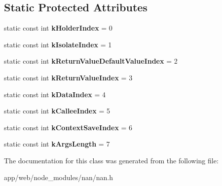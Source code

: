 \subsection*{Static Protected Attributes}
\begin{DoxyCompactItemize}
\item 
\mbox{\label{class_nan_1_1_function_callback_info_ac8350fbf0aba0449e7c6395d5af87ab2}} 
static const int {\bfseries k\+Holder\+Index} = 0
\item 
\mbox{\label{class_nan_1_1_function_callback_info_a0d0886259f0f67d56e927628b8e25a31}} 
static const int {\bfseries k\+Isolate\+Index} = 1
\item 
\mbox{\label{class_nan_1_1_function_callback_info_ad631440c4665af55571a2399542ae2f8}} 
static const int {\bfseries k\+Return\+Value\+Default\+Value\+Index} = 2
\item 
\mbox{\label{class_nan_1_1_function_callback_info_a20ccb227e5056b7822d882e27ec5eed2}} 
static const int {\bfseries k\+Return\+Value\+Index} = 3
\item 
\mbox{\label{class_nan_1_1_function_callback_info_ae3cb196718e2c2841fd16df80f9a9d7d}} 
static const int {\bfseries k\+Data\+Index} = 4
\item 
\mbox{\label{class_nan_1_1_function_callback_info_ab57b34ceb16d7c985f7ce465ac5969a8}} 
static const int {\bfseries k\+Callee\+Index} = 5
\item 
\mbox{\label{class_nan_1_1_function_callback_info_a93286a146af99c122eab8d94aeb22861}} 
static const int {\bfseries k\+Context\+Save\+Index} = 6
\item 
\mbox{\label{class_nan_1_1_function_callback_info_a5d5ef1c2c3d9a55e80b9ca78c163d838}} 
static const int {\bfseries k\+Args\+Length} = 7
\end{DoxyCompactItemize}


The documentation for this class was generated from the following file\+:\begin{DoxyCompactItemize}
\item 
app/web/node\+\_\+modules/nan/nan.\+h\end{DoxyCompactItemize}
